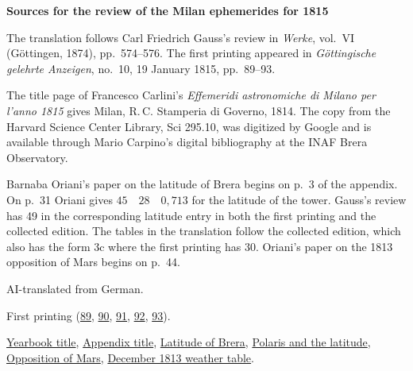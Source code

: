 \clearpage\thispagestyle{empty}
\begin{center}\Large\bfseries Sources for the review of the Milan ephemerides for 1815\end{center}

The translation follows Carl Friedrich Gauss’s review in \emph{Werke}, vol.~VI (Göttingen, 1874), pp.~574--576. The first printing appeared in \emph{Göttingische gelehrte Anzeigen}, no.~10, 19 January 1815, pp.~89--93.

The title page of Francesco Carlini’s \emph{Effemeridi astronomiche di Milano per l’anno 1815} gives Milan, R.\,C. Stamperia di Governo, 1814. The copy from the Harvard Science Center Library, Sci 295.10, was digitized by Google and is available through Mario Carpino’s digital bibliography at the INAF Brera Observatory.

Barnaba Oriani’s paper on the latitude of Brera begins on p.~3 of the appendix. On p.~31 Oriani gives $45\quad28\quad0{,}713$ for the latitude of the tower. Gauss’s review has 49 in the corresponding latitude entry in both the first printing and the collected edition. The tables in the translation follow the collected edition, which also has the form 3c where the first printing has 30. Oriani’s paper on the 1813 opposition of Mars begins on p.~44.

AI-translated from German.

First printing (\href{https://images.p.sub.uni-goettingen.de/iiif/image/gdz:PPN319721507_1815:00000091/full/1650,/0/default.jpg}{89}, \href{https://images.p.sub.uni-goettingen.de/iiif/image/gdz:PPN319721507_1815:00000092/full/1650,/0/default.jpg}{90}, \href{https://images.p.sub.uni-goettingen.de/iiif/image/gdz:PPN319721507_1815:00000093/full/1650,/0/default.jpg}{91}, \href{https://images.p.sub.uni-goettingen.de/iiif/image/gdz:PPN319721507_1815:00000094/full/1650,/0/default.jpg}{92}, \href{https://images.p.sub.uni-goettingen.de/iiif/image/gdz:PPN319721507_1815:00000095/full/1650,/0/default.jpg}{93}).

\href{https://www1.brera.inaf.it/~mario.carpino/Biblioteca_Digitale/Effemeridi_Milano/mirror/EM1815b.pdf#page=8}{Yearbook title}, \href{https://www1.brera.inaf.it/~mario.carpino/Biblioteca_Digitale/Effemeridi_Milano/mirror/EM1815b.pdf#page=144}{Appendix title}, \href{https://www1.brera.inaf.it/~mario.carpino/Biblioteca_Digitale/Effemeridi_Milano/mirror/EM1815b.pdf#page=146}{Latitude of Brera}, \href{https://www1.brera.inaf.it/~mario.carpino/Biblioteca_Digitale/Effemeridi_Milano/mirror/EM1815b.pdf#page=174}{Polaris and the latitude}, \href{https://www1.brera.inaf.it/~mario.carpino/Biblioteca_Digitale/Effemeridi_Milano/mirror/EM1815b.pdf#page=187}{Opposition of Mars}, \href{https://www1.brera.inaf.it/~mario.carpino/Biblioteca_Digitale/Effemeridi_Milano/mirror/EM1815b.pdf#page=255}{December 1813 weather table}.

\clearpage
